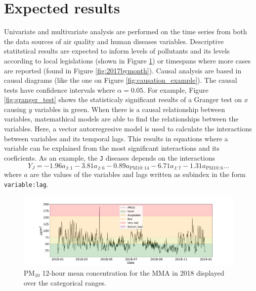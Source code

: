 \documentclass[
  11pt,
  a4paper,
  oneside
]{article}
\begin{document}
\section{Expected results}
Univariate and multivariate analysis are performed on the time series from both the data sources of air quality and human diseases variables. Descriptive statitstical results are expected to inform levels of pollutants and its levels according to local legislations (shown in Figure \ref{fig:ts_2018_pm10}) or timespans where more cases are reported (found in Figure \ref{fig:2017bymonth}). Causal analysis are based in causal diagrams (like the one on Figure \ref{fig:causation_example}). The causal tests have confidence intervals where $\alpha = 0.05$. For example, Figure \ref{fig:granger_test} shows the statisticaly significant results of a Granger test on $x$ causing $y$ variables in green. When there is a causal relationship between variables, matemathical models are able to find the relationships between the variables. Here, a vector autorregresive model is used to calculate the interactions between variables and its temporal lags. This results in equations where a variable can be explained from the most significant interactions and its coeficients. As an example, the \texttt{J} diseases depends on the interactions
\begin{equation*}
    Y_J = -1.96 a_{\texttt{J}:1} -3.81 a_{\texttt{J}:6} -0.89 a_{\text{PM10}:14} -6.71 a_{\texttt{J}:7} -1.31 a_{\text{PM10}:6} \ldots
\end{equation*}
where $a$ are the values of the variables and lags written as subindex in the form \texttt{variable:lag}.

\begin{figure}
    \centering
    \includegraphics[width=1\textwidth]{figs/ts_2018_pm10.pdf}
    \caption{PM$_{10}$ 12-hour mean concentration for the MMA in 2018 displayed over the categorical ranges.}
    \label{fig:ts_2018_pm10}
\end{figure}
\end{document}
